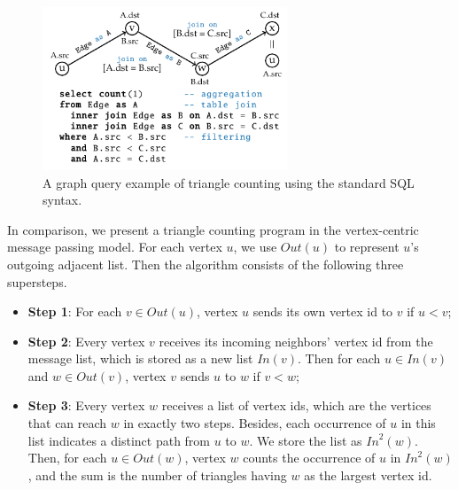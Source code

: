 \documentclass{sokendai_thesis} %
\begin{document}



\begin{figure}
\centering
\includegraphics[width=0.65\textwidth]{figures/join-tc.pdf}
\caption{A graph query example of triangle counting using the standard SQL syntax.}
\label{fig:join-tc}
\vspace{-5pt}
\end{figure}

In comparison, we present a triangle counting program in the vertex-centric message passing model.
For each vertex $u$, we use $\mathit{Out}(u)$ to represent $u$'s outgoing adjacent list.
Then the algorithm consists of the following three supersteps.
\begin{itemize}
  \item \textbf{Step 1}:
    For each $v\in \mathit{Out}(u)$, vertex $u$ sends its own vertex id to $v$ if $u<v$;
  \item \textbf{Step 2}:
    Every vertex $v$ receives its incoming neighbors' vertex id from the message list, which is stored as a new list $\mathit{In}(v)$.
    Then for each $u\in \mathit{In}(v)$ and $w\in \mathit{Out}(v)$, vertex $v$ sends $u$ to $w$ if $v<w$;
  \item \textbf{Step 3}:
    Every vertex $w$ receives a list of vertex ids, which are the vertices that can reach $w$ in exactly two steps.
    Besides, each occurrence of $u$ in this list indicates a distinct path from $u$ to $w$.
    We store the list as $\mathit{In}^2(w)$.
    Then, for each $u\in \mathit{Out}(w)$, vertex $w$ counts the occurrence of $u$ in $\mathit{In}^2(w)$, and the sum is the number of triangles having $w$ as the largest vertex id.
\end{itemize}
\end{document}
